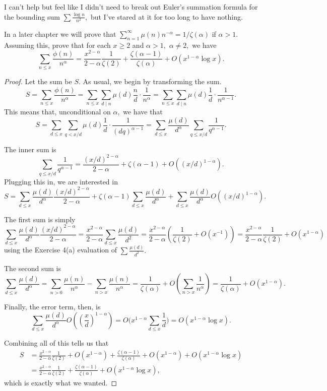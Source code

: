 I can't help but feel like I didn't need to break out Euler's summation formula for the bounding sum $\sum\frac{\log n}{n^2},$ but I've stared at it for too long to have nothing.

\begin{exercise}
In a later chapter we will prove that $\sum_{n=1}^\infty\mu(n)n^{-\alpha}=1/\zeta(\alpha)$ if $\alpha>1.$ Assuming this, prove that for each $x\ge2$ and $\alpha>1,$ $\alpha\ne2,$ we have
\[\sum_{n\le x}\frac{\phi(n)}{n^{\alpha}}=\frac{x^{2-\alpha}}{2-\alpha}\frac1{\zeta(2)}+\frac{\zeta(\alpha-1)}{\zeta(\alpha)}+O\left(x^{1-\alpha}\log x\right).\]
\end{exercise}

\begin{proof}
Let the sum be $S.$ As usual, we begin by transforming the sum.
\[S=\sum_{n\le x}\frac{\phi(n)}{n^{\alpha}}=\sum_{n\le x}\sum_{d\mid n}\mu(d)\frac nd\cdot\frac1{n^\alpha}=\sum_{n\le x}\sum_{d\mid n}\mu(d)\frac1d\cdot\frac1{n^{\alpha-1}}.\]
This means that, unconditional on $\alpha,$ we have that
\[S=\sum_{d\le x}\sum_{q< x/d}\mu(d)\frac1d\cdot\frac1{(dq)^{\alpha-1}}=\sum_{d\le x}\frac{\mu(d)}{d^\alpha}\sum_{q\le x/d}\frac1{q^{\alpha-1}}.\]

The inner sum is
\[\sum_{q\le x/d}\frac1{q^{\alpha-1}}=\frac{(x/d)^{2-\alpha}}{2-\alpha}+\zeta(\alpha-1)+O\left((x/d)^{1-\alpha}\right).\]
Plugging this in, we are interested in
\[S=\sum_{d\le x}\frac{\mu(d)}{d^\alpha}\frac{(x/d)^{2-\alpha}}{2-\alpha}+\zeta(\alpha-1)\sum_{d\le x}\frac{\mu(d)}{d^\alpha}+\sum_{d\le x}\frac{\mu(d)}{d^\alpha}O\left((x/d)^{1-\alpha}\right).\]

The first sum is simply
\[\sum_{d\le x}\frac{\mu(d)}{d^\alpha}\frac{(x/d)^{2-\alpha}}{2-\alpha}=\frac{x^{2-\alpha}}{2-\alpha}\sum_{d\le x}\frac{\mu(d)}{d^2}=\frac{x^{2-\alpha}}{2-\alpha}\left(\frac1{\zeta(2)}+O\left(x^{-1}\right)\right)=\frac{x^{2-\alpha}}{2-\alpha}\frac1{\zeta(2)}+O\left(x^{1-\alpha}\right)\]
using the Exercise 4(a) evaluation of $\sum\frac{\mu(d)}{d^2}.$

The second sum is
\[\sum_{d\le x}\frac{\mu(d)}{d^\alpha}=\sum_{n>0}\frac{\mu(n)}{n^\alpha}-\sum_{n>x}\frac{\mu(n)}{n^\alpha}=\frac1{\zeta(\alpha)}+O\left(\sum_{n>x}\frac1{n^\alpha}\right)=\frac1{\zeta(\alpha)}+O\left(x^{1-\alpha}\right).\]

Finally, the error term, then, is
\[\sum_{d\le x}\frac{\mu(d)}{d^\alpha}O\left(\left(\frac xd\right)^{1-\alpha}\right)=O\Bigg(x^{1-\alpha}\sum_{d\le x}\frac1d\Bigg)=O\left(x^{1-\alpha}\log x\right).\]

Combining all of this tells us that
\begin{align*}
    S &= \frac{x^{2-\alpha}}{2-\alpha}\frac1{\zeta(2)}+O\left(x^{1-\alpha}\right)+\frac{\zeta(\alpha-1)}{\zeta(\alpha)}+O\left(x^{1-\alpha}\right)+O\left(x^{1-\alpha}\log x\right) \\
    &= \frac{x^{2-\alpha}}{2-\alpha}\frac1{\zeta(2)}+\frac{\zeta(\alpha-1)}{\zeta(\alpha)}+O\left(x^{1-\alpha}\log x\right),
\end{align*}
which is exactly what we wanted.
\end{proof}

